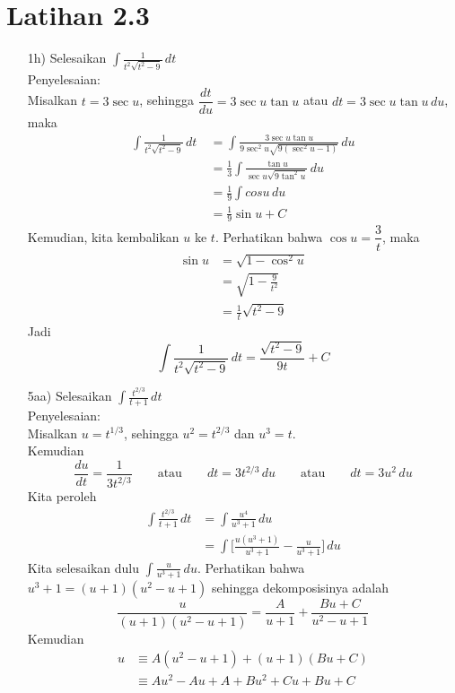 \documentclass{article}
\begin{document}
\section*{Latihan 2.3}
\begin{enumerate}
	\item[1h)] Selesaikan \(\displaystyle \int \frac{1}{t^2\sqrt{t^2-9}} \, dt\) \\
	Penyelesaian: \\
	Misalkan $t=3\sec u$, sehingga $\dfrac{dt}{du}=3\sec u\tan u$ atau $dt = 3\sec u\tan u \,du$, maka
	\begin{align*}
	\int \frac{1}{t^2\sqrt{t^2-9}} \, dt\ &= \int \frac{3\sec u\tan u}{9\sec^2u\sqrt{9(\sec^2 u -1)}} \, du \\
	&= \frac{1}{3}\int \frac{\tan u}{\sec u\sqrt{9\tan^2 u}} \, du \\
	&= \frac{1}{9} \int cos u \, du \\
	&= \frac{1}{9} \sin u + C
	\end{align*}
	Kemudian, kita kembalikan $u$ ke $t$. Perhatikan bahwa $\cos u=\dfrac{3}{t}$, maka
	\begin{align*}
	\sin u &= \sqrt{1-\cos^2u} \\
	&= \sqrt{1-\frac{9}{t^2}} \\
	&= \frac{1}{t}\sqrt{t^2-9}
	\end{align*}
	Jadi \[\int \frac{1}{t^2\sqrt{t^2-9}} \, dt = \frac{\sqrt{t^2-9}}{9t} + C\]
	\item[5aa)] Selesaikan \(\displaystyle \int \frac{t^{2/3}}{t+1} \, dt\) \\
	Penyelesaian: \\
	Misalkan $u=t^{1/3}$, sehingga $u^2=t^{2/3}$ dan $u^3=t$. \\
	Kemudian \[\dfrac{du}{dt} = \dfrac{1}{3t^{2/3}} \qquad \text{atau} \qquad dt=3t^{2/3} \, du \qquad \text{atau} \qquad dt=3u^2 \, du \]
	Kita peroleh 
	\begin{align*}
	\int \frac{t^{2/3}}{t+1} \, dt &= \int \frac{u^4}{u^3+1} \, du \\
	&= \int \bigg[\frac{u(u^3+1)}{u^3+1} - \frac{u}{u^3+1}\bigg] \, du
	\end{align*}
	Kita selesaikan dulu \(\displaystyle \int \frac{u}{u^3+1} \, du\). Perhatikan bahwa $u^3+1=(u+1)(u^2-u+1)$ sehingga dekomposisinya adalah \[\frac{u}{(u+1)(u^2-u+1)} = \frac{A}{u+1} + \frac{Bu+C}{u^2-u+1}\]
	Kemudian 
	\begin{align*}
	u &\equiv A(u^2-u+1)+(u+1)(Bu+C) \\
	&\equiv Au^2-Au+A+Bu^2+Cu+Bu+C \\

\end{align*}
\end{enumerate}
\end{document}
